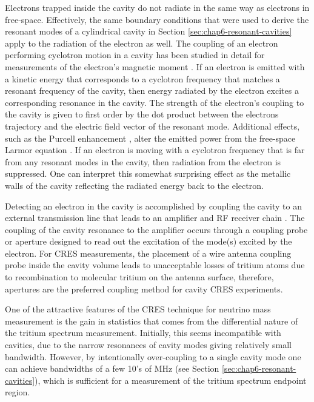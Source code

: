 Electrons trapped inside the cavity do not radiate in the same way as electrons in free-space. Effectively, the same boundary conditions that were used to derive the resonant modes of a cylindrical cavity in Section \ref{sec:chap6-resonant-cavities} apply to the radiation of the electron as well. The coupling of an electron performing cyclotron motion in a cavity has been studied in detail for measurements of the electron's magnetic moment \cite{cyclotron_motion_cavity, hanneke_paper, hanneke_thesis}. If an electron is emitted with a kinetic energy that corresponds to a cyclotron frequency that matches a resonant frequency of the cavity, then energy radiated by the electron excites a corresponding resonance in the cavity. The strength of the electron's coupling to the cavity is given to first order by the dot product between the electrons trajectory and the electric field vector of the resonant mode. Additional effects, such as the Purcell enhancement \cite{purcell}, alter the emitted power from the free-space Larmor equation \cite{larmor_eqn}. If an electron is moving with a cyclotron frequency that is far from any resonant modes in the cavity, then radiation from the electron is suppressed. One can interpret this somewhat surprising effect as the metallic walls of the cavity reflecting the radiated energy back to the electron. 

Detecting an electron in the cavity is accomplished by coupling the cavity to an external transmission line that leads to an amplifier and RF receiver chain \cite{cavity_coupled_to_amp}. The coupling of the cavity resonance to the amplifier occurs through a coupling probe or aperture designed to read out the excitation of the mode(s) excited by the electron. For CRES measurements, the placement of a wire antenna coupling probe inside the cavity volume leads to unacceptable losses of tritium atoms due to recombination to molecular tritium on the antenna surface, therefore, apertures are the preferred coupling method for cavity CRES experiments.

One of the attractive features of the CRES technique for neutrino mass measurement is the gain in statistics that comes from the differential nature of the tritium spectrum measurement. Initially, this seems incompatible with cavities, due to the narrow resonances of cavity modes giving relatively small bandwidth. However, by intentionally over-coupling to a single cavity mode one can achieve bandwidths of a few 10's of MHz (see Section \ref{sec:chap6-resonant-cavities}), which is sufficient for a measurement of the tritium spectrum endpoint region.  

